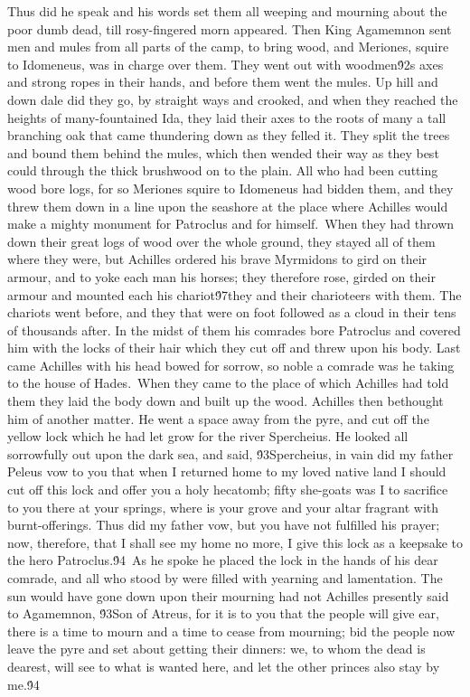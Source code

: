 {Thus did he speak and his words set them all weeping and mourning about the poor dumb dead, till rosy-fingered morn appeared. Then King Agamemnon sent men and mules from all parts of the camp, to bring wood, and Meriones, squire to Idomeneus, was in charge over them. They went out with woodmen\'92s axes and strong ropes in their hands, and before them went the mules. Up hill and down dale did they go, by straight ways and crooked, and when they reached the heights of many-fountained Ida, they laid their axes to the roots of many a tall branching oak that came thundering down as they felled it. They split the trees and bound them behind the mules, which then wended their way as they best could through the thick brushwood on to the plain. All who had been cutting wood bore logs, for so Meriones squire to Idomeneus had bidden them, and they threw them down in a line upon the seashore at the place where Achilles would make a mighty monument for Patroclus and for himself.\
When they had thrown down their great logs of wood over the whole ground, they stayed all of them where they were, but Achilles ordered his brave Myrmidons to gird on their armour, and to yoke each man his horses; they therefore rose, girded on their armour and mounted each his chariot\'97they and their charioteers with them. The chariots went before, and they that were on foot followed as a cloud in their tens of thousands after. In the midst of them his comrades bore Patroclus and covered him with the locks of their hair which they cut off and threw upon his body. Last came Achilles with his head bowed for sorrow, so noble a comrade was he taking to the house of Hades.\
When they came to the place of which Achilles had told them they laid the body down and built up the wood. Achilles then bethought him of another matter. He went a space away from the pyre, and cut off the yellow lock which he had let grow for the river Spercheius. He looked all sorrowfully out upon the dark sea, and said, \'93Spercheius, in vain did my father Peleus vow to you that when I returned home to my loved native land I should cut off this lock and offer you a holy hecatomb; fifty she-goats was I to sacrifice to you there at your springs, where is your grove and your altar fragrant with burnt-offerings. Thus did my father vow, but you have not fulfilled his prayer; now, therefore, that I shall see my home no more, I give this lock as a keepsake to the hero Patroclus.\'94\
As he spoke he placed the lock in the hands of his dear comrade, and all who stood by were filled with yearning and lamentation. The sun would have gone down upon their mourning had not Achilles presently said to Agamemnon, \'93Son of Atreus, for it is to you that the people will give ear, there is a time to mourn and a time to cease from mourning; bid the people now leave the pyre and set about getting their dinners: we, to whom the dead is dearest, will see to what is wanted here, and let the other princes also stay by me.\'94\
}
